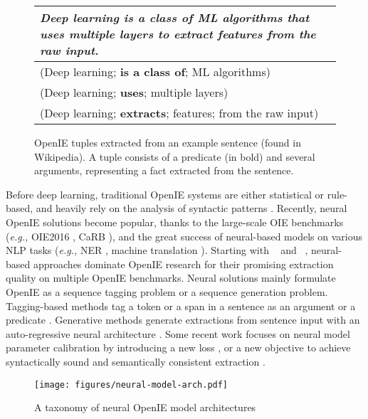 \documentclass{article}
\newcommand{\eg}{\emph{e.g.,}\xspace}
\begin{document}
\begin{figure}[th]
\centering
\begin{tabular}{p{8.1cm}}
    \toprule
     \textit{Deep learning is a class of ML algorithms that uses multiple layers to extract  features from the raw input.} \\
     \midrule
     (Deep learning; \textbf{is a class of}; ML algorithms)\\
     (Deep learning; \textbf{uses}; multiple layers)\\
     (Deep learning; \textbf{extracts}; features; from the raw input) \\
     \bottomrule
\end{tabular}
\caption{OpenIE tuples extracted from an example sentence (found in Wikipedia). A tuple consists of a predicate (in bold) and several arguments, representing a fact extracted from the sentence.}
\label{fig:openieexp}
\vspace{-1em}
\end{figure}

Before deep learning, traditional OpenIE systems are either statistical or rule-based, and heavily rely on the analysis of syntactic patterns \cite{niklaus-etal-2018-survey}. Recently, neural OpenIE solutions become popular, thanks to the large-scale OIE benchmarks (\eg OIE2016 \cite{stanovsky-dagan-2016-creating}, CaRB \cite{bhardwaj-etal-2019-carb}), and the great success of neural-based models on various NLP tasks (\eg NER \cite{li2020survey}, machine translation \cite{Yang2020ASO}). 
Starting with \citeauthor{stanovsky-etal-2018-supervised}~\citeyear{stanovsky-etal-2018-supervised} and \citeauthor{cui-etal-2018-neural}~\citeyear{cui-etal-2018-neural}, neural-based approaches dominate OpenIE research for their promising extraction quality on multiple OpenIE benchmarks. Neural solutions mainly formulate OpenIE as a sequence tagging problem or a sequence generation problem. 
Tagging-based methods tag a token or a span in a sentence as an argument or a predicate \cite{stanovsky-etal-2018-supervised,kolluru-etal-2020-openie6,zhanandzhao-2020-span}. 
Generative methods  generate extractions from sentence input with an auto-regressive neural architecture \cite{cui-etal-2018-neural,kolluru-etal-2020-imojie}. 
Some recent work focuses on neural model parameter calibration by introducing a new loss \cite{jiang-etal-2019-improving}, or a new objective to achieve syntactically sound and semantically consistent extraction \cite{tang-etal-2020-syntactic}.

\begin{figure*}[th]
    \centering
    \texttt{[image: figures/neural-model-arch.pdf]}
    \caption{A taxonomy of neural OpenIE model architectures}
    \label{fig:neuralmodel}
    \vspace{-1em}
\end{figure*}
\end{document}
